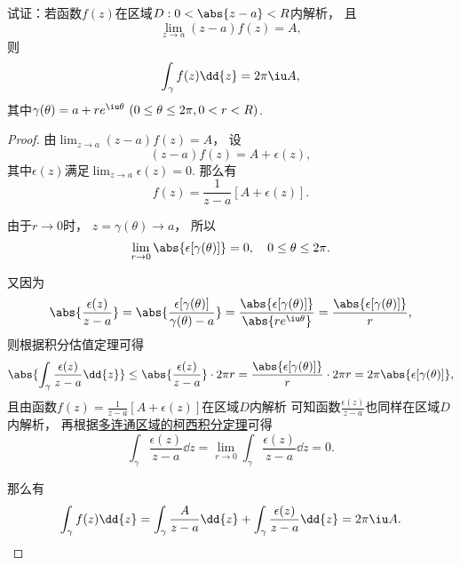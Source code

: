 \begin{example}%
试证：若函数\(f(z)\)在区域\(D: 0<\abs{z-a}<R\)内解析，
且\begin{equation*}
	\lim_{z \to a}(z-a)f(z)=A,
\end{equation*}
则\begin{equation*}
	\int_\gamma f(z) \dd{z} = 2\pi\iu A,
\end{equation*}
其中\(\gamma(\theta) = a+re^{\iu\theta}\ (0 \leq \theta \leq 2\pi, 0 < r < R)\).
\begin{proof}
由\(\lim_{z \to a}(z-a)f(z) = A\)，
设\begin{equation*}
	(z-a)f(z) = A + \epsilon(z),
\end{equation*}
其中\(\epsilon(z)\)满足\(\lim_{z \to a} \epsilon(z) = 0\).
那么有\begin{equation*}
	f(z) = \frac{1}{z-a}[A+\epsilon(z)].
\end{equation*}

由于\(r\to0\)时，
\(z=\gamma(\theta) \to a\)，
所以\begin{equation*}
	\lim_{r\to0} \abs{\epsilon[\gamma(\theta)]} = 0,
	\quad 0 \leq \theta \leq 2\pi.
\end{equation*}

又因为\begin{equation*}
	\abs{\frac{\epsilon(z)}{z-a}}
	= \abs{\frac{\epsilon[\gamma(\theta)]}{\gamma(\theta)-a}}
	= \frac{\abs{\epsilon[\gamma(\theta)]}}{\abs{re^{\iu\theta}}}
	= \frac{\abs{\epsilon[\gamma(\theta)]}}{r},
\end{equation*}
则根据积分估值定理可得\begin{equation*}
	\abs{\int_\gamma \frac{\epsilon(z)}{z-a} \dd{z}}
	\leq \abs{\frac{\epsilon(z)}{z-a}} \cdot 2\pi r
	= \frac{\abs{\epsilon[\gamma(\theta)]}}{r} \cdot 2\pi r
	= 2\pi \abs{\epsilon[\gamma(\theta)]},
\end{equation*}
且由函数\(f(z) = \frac{1}{z-a}[A+\epsilon(z)]\)在区域\(D\)内解析
可知函数\(\frac{\epsilon(z)}{z-a}\)也同样在区域\(D\)内解析，
再根据\hyperref[theorem:解析函数的积分表示.多连通区域的柯西积分定理]{多连通区域的柯西积分定理}可得\begin{equation*}
	\int_\gamma \frac{\epsilon(z)}{z-a} \dd{z}
	= \lim_{r\to0} \int_\gamma \frac{\epsilon(z)}{z-a} \dd{z}
	= 0.
\end{equation*}

那么有\begin{equation*}
	\int_\gamma f(z) \dd{z}
	= \int_\gamma \frac{A}{z-a} \dd{z}
	+ \int_\gamma \frac{\epsilon(z)}{z-a} \dd{z}
	= 2\pi\iu A.
	\qedhere
\end{equation*}
\end{proof}
\end{example}

